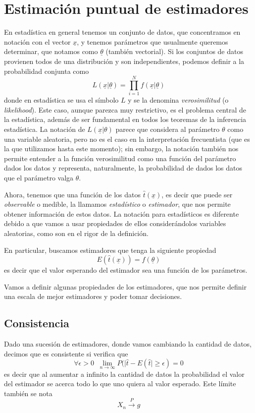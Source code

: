 \documentclass{article}
\numberwithin{equation}{section} %
\begin{document}
\section{Estimación puntual de estimadores}
En estadística en general tenemos un conjunto de datos, que concentramos en notación con el vector $\underline{x}$, y tenemos parámetros que usualmente queremos determinar, que notamos como $\underline{\theta}$ (también vectorial). Si los conjuntos de datos provienen todos de una distribución y son independientes, podemos definir a la probabilidad conjunta como
\begin{equation}
L(\underline{x}|\underline{\theta}) = \prod_{i = 1}^N f(\underline{x}|\underline{\theta})
\end{equation}
donde en estadística se usa el símbolo $L$ y se la denomina \emph{verosimilitud} (o \emph{likelihood}). Este caso, aunque parezca muy restrictivo, es el problema central de la estadística, además de ser fundamental en todos los teoremas de la inferencia estadística. La notación de $L(\underline{x}|\theta)$ parece que considera al parámetro $\theta$ como una variable aleatoria, pero no es el caso en la interpretación frecuentista (que es la que utilizamos hasta este momento); sin embargo, la notación también nos permite entender a la función verosimilitud como una función del parámetro dados los datos y representa, naturalmente, la probabilidad de dados los datos que el parámetro valga $\theta$.

Ahora, tenemos que una función de los datos $\hat{t}(\underline{x})$, es decir que puede ser \emph{observable} o medible, la llamamos \emph{estadístico} o \emph{estimador}, que nos permite obtener información de estos datos. La notación para estadísticos es diferente debido a que vamos a usar propiedades de ellos considerándolos variables aleatorias, como son en el rigor de la definición. 

En particular, buscamos estimadores que tenga la siguiente propiedad
\begin{equation}
E(\hat{t}(\underline{x})) = f(\underline{\theta})
\end{equation}
es decir que el valor esperando del estimador sea una función de los parámetros.

Vamos a definir algunas propiedades de los estimadores, que nos permite definir una escala de mejor estimadores y poder tomar decisiones.

\subsection{Consistencia}
Dado una sucesión de estimadores, donde vamos cambiando la cantidad de datos, decimos que es consistente si verifica que
\begin{equation}
\forall \epsilon > 0 \; \; \lim_{n\to\infty} P(|\hat{t} - E(\hat{t}| \geq \epsilon) = 0
\end{equation}
es decir que al aumentar a infinito la cantidad de datos la probabilidad el valor del estimador se acerca todo lo que uno quiera al valor esperado. Este límite también se nota
\begin{equation}
X_n \xrightarrow{P} g
\end{equation}
\end{document}

